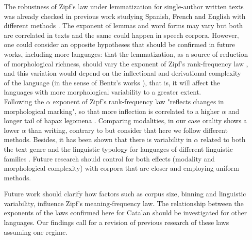 \documentclass[10pt,letterpaper]{article}
\newif\ifarxiv
\begin{document}
The robustness of Zipf’s law under lemmatization for single-author written texts was already checked in previous work studying Spanish, French and English with different methods \cite{Corral2015}. The exponent of lemmas and word forms may vary but both are correlated in texts \cite{Corral2015} and the same could happen in speech corpora. However, one could consider an opposite hypotheses that should be confirmed in future works, including more languages: that the lemmatization, as a source of reduction of morphological richness, should vary the exponent of Zipf's rank-frequency law \cite{Corral2015}, and this variation would depend on the inflectional and derivational complexity of the language (in the sense of Bentz's works \cite{bentz2018adaptive, Bentzetal2017, bentz2016}), that is, it will affect the languages with more morphological variability to a greater extent.\\ 

Following \cite{Chand2017} the $\alpha$ exponent of Zipf's rank-frequency law "reflects changes in morphological marking"\cite{Chand2017}, so that more inflection is correlated to a higher $\alpha$ and longer tail of hapax legomena \cite{bentz2018adaptive, Chand2017}. Comparing modalities, in our case orality shows a lower $\alpha$ than writing, contrary to \cite{Chand2017} but consider that here we follow different methods. Besides, it has been shown that there is variability in $\alpha$ related to both the text genre and the linguistic typology for languages of different linguistic families \cite{yu2018zipfs}. Future research should control for both effects (modality and morphological complexity) with corpora that are closer and employing   uniform methods.

Future work should clarify how factors such as corpus size, binning and linguistic variability, influence Zipf's meaning-frequency law.
The relationship between the exponents of the laws confirmed here for Catalan should be investigated for other languages. Our findings call for a revision of previous research of these laws assuming one regime.


\ifarxiv	%
\else
\end{document}
